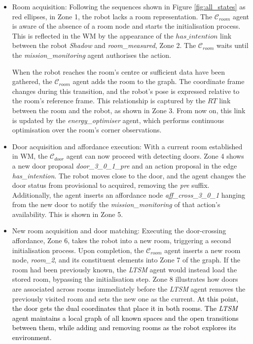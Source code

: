 \documentclass[10pt,a4paper]{article}
\begin{document}
\begin{itemize}
    \item Room acquisition: Following the sequences shown in Figure \ref{fig:all_states} as red ellipses, in Zone 1, the robot lacks a room representation. The $\mathcal{C}_{room}$ agent is aware of the absence of a room node and starts the initialisation process. This is reflected in the WM by the appearance of the $has\_intention$ link between the robot \textit{Shadow} and \textit{room\_measured}, Zone 2. The $\mathcal{C}_{room}$ waits until the \textit{mission\_monitoring} agent authorises the action.

    When the robot reaches the room's centre or sufficient data have been gathered, the $\mathcal{C}_{room}$ agent adds the room to the graph. The coordinate frame changes during this transition, and the robot’s pose is expressed relative to the room’s reference frame. This relationship is captured by the $RT$ link between the room and the robot, as shown in Zone 3. From now on, this link is updated by the \textit{energy\_optimiser} agent, which performs continuous optimisation over the room’s corner observations. 

     \item Door acquisition and affordance execution: With a current room established in WM, the $\mathcal{C}_{door}$ agent can now proceed with detecting doors. Zone 4 shows a new door proposal \textit{door\_3\_0\_1\_pre} and an action proposal in the edge \textit{has\_intention}. The robot moves close to the door, and the agent changes the door status from provisional to acquired, removing the \textit{pre} suffix. Additionally, the agent inserts an affordance node \textit{aff\_cross\_3\_0\_1} hanging from the new door to notify the \textit{mission\_monitoring} of that action's availability. This is shown in Zone 5.

     \item New room acquisition and door matching: Executing the door-crossing affordance, Zone 6, takes the robot into a new room, triggering a second initialisation process. Upon completion, the $\mathcal{C}_{room}$ agent inserts a new room node, \textit{room\_2}, and its constituent elements into Zone 7 of the graph. If the room had been previously known, the \textit{LTSM} agent would instead load the stored room, bypassing the initialisation step. Zone 8 illustrates how doors are associated across rooms immediately before the \textit{LTSM} agent removes the previously visited room and sets the new one as the current. \textcolor{black}{At this point, the door gets the dual coordinates that place it in both rooms. The \textit{LTSM} agent maintains a local graph of all known spaces and the open transitions between them, while adding and removing rooms as the robot explores its environment.}
\end{itemize}
\end{document}
